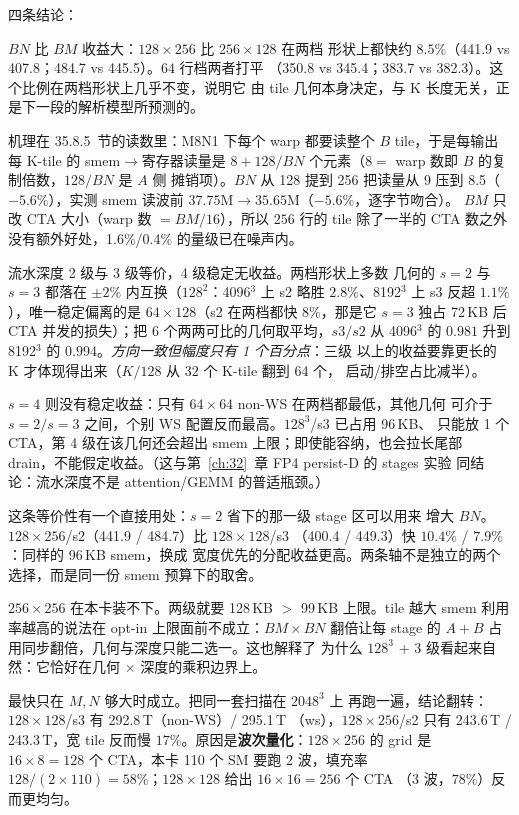 四条结论：

$BN$ 比 $BM$ 收益大：$128\times256$ 比 $256\times128$ 在两档
形状上都快约 $8.5\%$（441.9 vs 407.8；484.7 vs 445.5）。$64$ 行档两者打平
（350.8 vs 345.4；383.7 vs 382.3）。这个比例在两档形状上几乎不变，说明它
由 tile 几何本身决定，与 K 长度无关，正是下一段的解析模型所预测的。

机理在 35.8.5~节的读数里：M8N1 下每个 warp 都要读整个 $B$ tile，于是每输出
每 K-tile 的 smem$\to$寄存器读量是
$8 + 128/BN$ 个元素（$8=$ warp 数即 $B$ 的复制倍数，$128/BN$ 是 $A$ 侧
摊销项）。$BN$ 从 128 提到 256 把读量从 9 压到 8.5（$-5.6\%$），实测
smem 读波前 $37.75\text{M}\to35.65\text{M}$（$-5.6\%$，逐字节吻合）。
$BM$ 只改 CTA 大小（warp 数 $=BM/16$），所以 $256$ 行的 tile 除了一半的
CTA 数之外没有额外好处，1.6\%/0.4\% 的量级已在噪声内。

流水深度 2 级与 3 级等价，4 级稳定无收益。两档形状上多数
几何的 $s{=}2$ 与 $s{=}3$ 都落在 $\pm2\%$ 内互换（$128^2$：4096$^3$ 上
s2 略胜 $2.8\%$、8192$^3$ 上 s3 反超 $1.1\%$），唯一稳定偏离的是
$64\times128$（s2 在两档都快 $8\%$，那是它 $s{=}3$ 独占 72\,KB 后 CTA
并发的损失）；把 6 个两两可比的几何取平均，$s3/s2$ 从 4096$^3$ 的 $0.981$
升到 8192$^3$ 的 $0.994$。\emph{方向一致但幅度只有 1 个百分点}：三级
以上的收益要靠更长的 K 才体现得出来（$K/128$ 从 32 个 K-tile 翻到 64 个，
启动/排空占比减半）。

$s{=}4$ 则没有稳定收益：只有 $64\times64$ non-WS 在两档都最低，其他几何
可介于 $s{=}2/s{=}3$ 之间，个别 WS 配置反而最高。$128^3$/s3 已占用 96\,KB、
只能放 1 个 CTA，第 4 级在该几何还会超出 smem 上限；即使能容纳，也会拉长尾部
drain，不能假定收益。（这与第~\ref{ch:32}~章 FP4 persist-D 的 stages 实验
同结论：流水深度不是 attention/GEMM 的普适瓶颈。）

这条等价性有一个直接用处：$s{=}2$ 省下的那一级 stage 区可以用来
增大 $BN$。$128\times256$/s2（441.9 / 484.7）比 $128\times128$/s3
（400.4 / 449.3）快 $10.4\%$ / $7.9\%$：同样的 96\,KB smem，换成
宽度优先的分配收益更高。两条轴不是独立的两个选择，而是同一份 smem
预算下的取舍。

$256\times256$ 在本卡装不下。两级就要 128\,KB $>$ 99\,KB
上限。tile 越大 smem 利用率越高的说法在 opt-in 上限面前不成立：$BM\times BN$
翻倍让每 stage 的 $A+B$ 占用同步翻倍，几何与深度只能二选一。这也解释了
为什么 $128^3$ + 3 级看起来自然：它恰好在几何 $\times$ 深度的乘积边界上。

最快只在 $M,N$ 够大时成立。把同一套扫描在 $2048^3$ 上
再跑一遍，结论翻转：$128\times128$/s3 有 292.8\,T（non-WS）/ 295.1\,T
（ws），$128\times256$/s2 只有 243.6\,T / 243.3\,T，宽 tile 反而慢
$17\%$。原因是\textbf{波次量化}：$128\times256$ 的 grid 是
$16\times8=128$ 个 CTA，本卡 110 个 SM 要跑 2 波，填充率
$128/(2\times110)=58\%$；$128\times128$ 给出 $16\times16=256$ 个 CTA
（3 波，$78\%$）反而更均匀。


